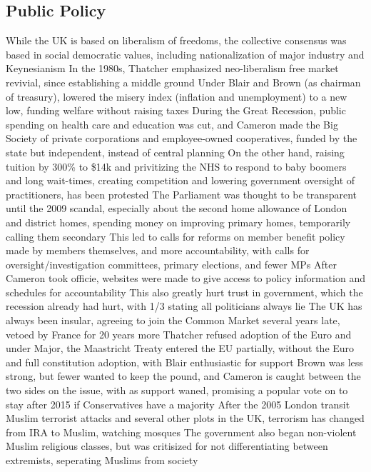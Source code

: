\documentclass[11 pt, twoside]{article}
\newenvironment{outline*}
{
	\begin{outline}[enumerate]
	}
	{\end{outline}
}
\begin{document}
\subsection{Public Policy}
\begin{outline*}
\1 While the UK is based on liberalism of freedoms, the collective consensus was based in social democratic values, including nationalization of  major industry and Keynesianism
\2 In the 1980s, Thatcher emphasized neo-liberalism free market revivial, since establishing a middle ground
\2 Under Blair and Brown (as chairman of treasury), lowered the misery index (inflation and unemployment) to a new low, funding welfare without raising taxes
\2 During the Great Recession, public spending on health care and education was cut, and Cameron made the Big Society of private corporations and employee-owned cooperatives, funded by the state but independent, instead of central planning
\3 On the other hand, raising tuition by 300\% to \$14k and privitizing the NHS to respond to baby boomers and long wait-times, creating competition and lowering government oversight of practitioners, has been protested
\1 The Parliament was thought to be transparent until the 2009 scandal, especially about the second home allowance of London and district homes, spending money on improving primary homes, temporarily calling them secondary
\2 This led to calls for reforms on member benefit policy made by members themselves, and more accountability, with calls for oversight/investigation committees, primary elections, and fewer MPs
\3 After Cameron took officie, websites were made to give access to policy information and schedules for accountability
\2 This also greatly hurt trust in government, which the recession already had hurt, with 1/3 stating all politicians always lie
\1 The UK has always been insular, agreeing to join the Common Market several years late, vetoed by France for 20 years more
\2 Thatcher refused adoption of the Euro and under Major, the Maastricht Treaty entered the EU partially, without the Euro and full constitution adoption, with Blair enthusiastic for support
\2 Brown was less strong, but fewer wanted to keep the pound, and Cameron is caught between the two sides on the issue, with as support waned, promising a popular vote on to stay after 2015 if Conservatives have a majority
\1 After the 2005 London transit Muslim terrorist attacks and several other plots in the UK, terrorism has changed from IRA to Muslim, watching mosques
\2 The government also began non-violent Muslim religious classes, but was critisized for not differentiating between extremists, seperating Muslims from society

\end{outline*}
\end{document}
